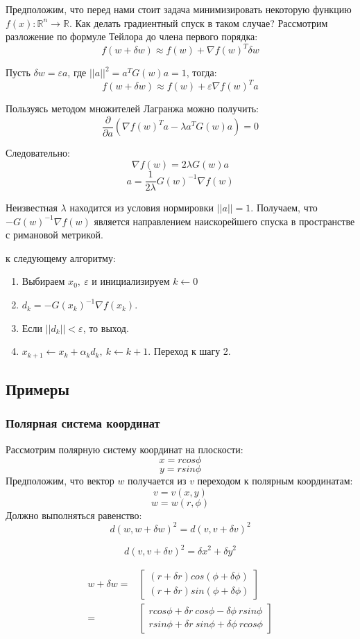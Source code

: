 \documentclass[a4paper,12pt]{article}
\begin{document}
Предположим, что перед нами стоит задача минимизировать некоторую функцию $f(x) : \mathbb{R}^{n} \rightarrow \mathbb{R}$.
Как делать градиентный спуск в таком случае?
Рассмотрим разложение по формуле Тейлора до члена первого порядка:
$$f(w + \delta w) \approx f(w) + \nabla{f(w)}^T {\delta w}$$

Пусть $\delta w = \varepsilon a$, где $||a||^2 = a^TG(w)a = 1$, тогда:
$$f(w + \delta w) \approx f(w) + \varepsilon \nabla{f(w)}^T a$$

Пользуясь методом множителей Лагранжа можно получить:
$$\frac{\partial}{\partial a} (\nabla{f(w)}^Ta - \lambda a^TG(w)a) = 0$$

Следовательно:
$$\nabla{f(w)} = 2\lambda G(w)a$$
$$a = \frac{1}{2 \lambda} G(w)^{-1}\nabla{f(w)}$$

Неизвестная $\lambda$ находится из условия нормировки $||a|| = 1$.
Получаем, что $-G(w)^{-1}\nabla{f(w)}$ является направлением наискорейшего спуска в пространстве с римановой метрикой.

 к следующему алгоритму:
\begin{enumerate}
    \item Выбираем $x_0, ~ \varepsilon $ и инициализируем $k \leftarrow 0$
    \item $d_k = -G(x_k)^{-1}\nabla{f(x_k)}$.
    \item Если $||d_k|| < \varepsilon$, то выход.
    \item $x_{k+1} \leftarrow x_{k} + \alpha_k d_k, ~ k \leftarrow k + 1$. Переход к шагу 2. 
\end{enumerate}

\newpage

\subsection{Примеры}
\subsubsection{Полярная система координат}
Рассмотрим полярную систему координат на плоскости:
$$ x = r cos \phi $$
$$ y = r sin \phi $$
Предположим, что вектор $w$ получается из $v$ переходом к полярным координатам:
$$ v = v(x, y) $$
$$ w = w(r, \phi) $$
Должно выполняться равенство:
$$d(w, w + \delta w)^2 = d(v, v + \delta v)^2$$

$$d(v, v + \delta v)^2 = {\delta x}^2 + {\delta y}^2$$

$$
\begin{aligned}
w + \delta w  
    = & \begin{bmatrix} 
        (r + \delta r) cos (\phi + \delta \phi) \\
        (r + \delta r) sin (\phi + \delta \phi) 
    \end{bmatrix} \\
    =   & \begin{bmatrix}
        r cos \phi + \delta r ~ cos \phi - \delta \phi ~ r sin \phi \\
        r sin \phi + \delta r ~ sin \phi + \delta \phi ~ r cos \phi
    \end{bmatrix}
\end{aligned}
$$
\end{document}
